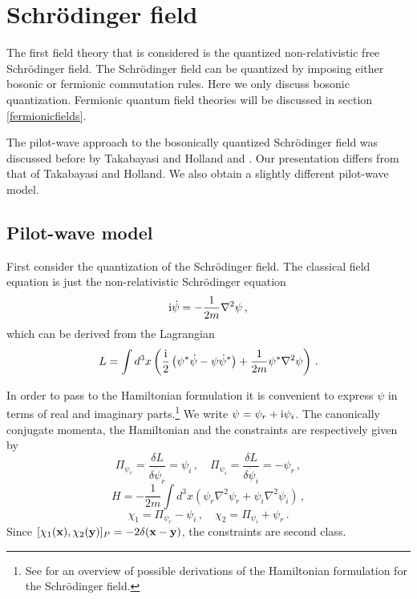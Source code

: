 \documentclass[12pt]{article}
\def\ii{\textrm i}
\begin{document}
\section{Schr{\"o}\-ding\-er field}\label{schroedingerfield}
The first field theory that is considered is the quantized non-relativistic free Schr{\"o}\-ding\-er field. The Schr{\"o}\-ding\-er field can be quantized by imposing either bosonic or fermionic commutation rules. Here we only discuss bosonic quantization. Fermionic quantum field theories will be discussed in section \ref{fermionicfields}.

The pilot-wave approach to the bosonically quantized Schr{\"o}\-ding\-er field was discussed before by Takabayasi \cite{takabayasi52} and Holland \cite{holland881} and \cite[pp.\ 449-451]{holland93b}. Our presentation differs from that of Takabayasi and Holland. We also obtain a slightly different pilot-wave model.  

\subsection{Pilot-wave model}
First consider the quantization of the Schr{\"o}\-ding\-er field. The classical field equation is just the non-relativistic Schr{\"o}\-ding\-er equation 
\begin{equation}
\ii{\dot \psi} = -\frac{1}{2m}  \nabla^2 \psi \,,
\label{s.1}
\end{equation}
which can be derived from the Lagrangian 
\begin{equation}
L =  \int d^3 x \left( \frac{\ii}{2}\left( \psi^*{\dot \psi}  - \psi {\dot \psi}^*\right) + \frac{1}{2m} \psi^* \nabla^2 \psi \right)\,.
\label{s.2}
\end{equation}

In order to pass to the Hamiltonian formulation it is convenient to express $\psi$ in terms of real and imaginary parts.{\footnote{See \cite{gergely02} for an overview of possible derivations of the Hamiltonian formulation for the Schr\"odinger field.}} We write $\psi=\psi_r + \ii \psi_i$. The canonically conjugate momenta, the Hamiltonian and the constraints are respectively given by  
\begin{equation}
\Pi_{\psi_r} = \frac{\delta L }{\delta {\dot \psi_r} } = \psi_i \,, \quad \Pi_{\psi_i} = \frac{\delta L }{\delta {\dot \psi_i} } = -\psi_r\,,
\label{s.3}
\end{equation}
\begin{equation}
H=-\frac{1}{2m} \int d^3 x \left(\psi_r \nabla^2 \psi_r + \psi_i \nabla^2 \psi_i \right)\,,
\label{s.4}
\end{equation}
\begin{equation}
\chi_1 = \Pi_{\psi_r} - \psi_i \,, \quad \chi_2 = \Pi_{\psi_i} + \psi_r \,.
\label{s.5}
\end{equation}
Since $[\chi_1({\bf x}),\chi_2({\bf y})]_P = -2\delta({\bf x} - {\bf y})$, the constraints are second class.
\end{document}
